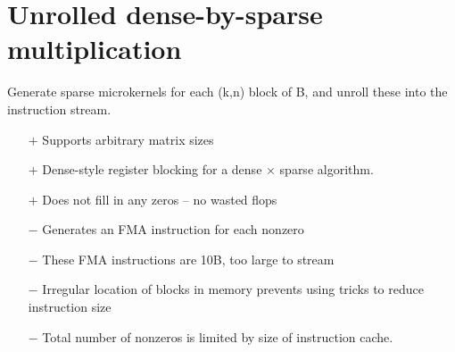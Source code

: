 \section{Unrolled dense-by-sparse multiplication}

Generate sparse microkernels for each (k,n) block of B, and unroll these into the instruction stream.
\begin{itemize}
      \item[$+$] Supports arbitrary matrix sizes
      \item[$+$] Dense-style register blocking for a dense $\times$ sparse algorithm.
      \item[$+$] Does not fill in any zeros -- no wasted flops

      \item[$-$] Generates an FMA instruction for each nonzero
      \item[$-$] These FMA instructions are 10B, too large to stream
      \item[$-$] Irregular location of blocks in memory prevents using tricks to reduce instruction size
      \item[$-$] Total number of nonzeros is limited by size of instruction cache.

\end{itemize}

